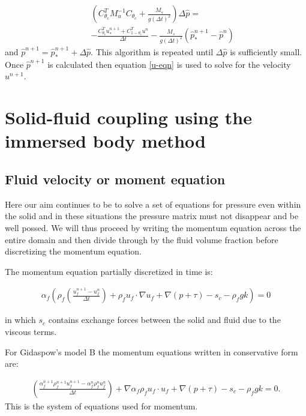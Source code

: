 \begin{eqnarray}
&&\left(C_{\theta_c}^T
M_u^{-1}C_{\theta_c}
+ \frac{M_s}{g (\Delta t)^2}\right) \Delta {\hat p} =  \nonumber\\
&& -\frac{
C_{\theta_c}^T u^{n+1}_*+C_{1-\theta_c}^T u^{n}
}{\Delta t}
-\frac{M_s}{g (\Delta t)^2}({\hat p}_*^{n+1}-{\hat p}^{n})
\label{Ceq5}
\end{eqnarray}
and ${\hat p}^{n+1}={\hat p}_*^{n+1}+\Delta {\hat p}$. This algorithm
is repeated until $\Delta {\hat p}$ is sufficiently small.
Once ${\hat p}^{n+1}$ is calculated then equation \ref{u-eqn}
is used to solve for the velocity $u^{n+1}$.






\vfill\eject



\section{Solid-fluid coupling using the immersed body method}



\subsection{Fluid velocity or moment equation}
Here our aim continues to be to solve a set of equations
for pressure even within the solid and in these situations
the pressure matrix must not disappear and be well possed.
We will thus proceed by writing the momentum equation
across the entire domain and then divide through by the
fluid volume fraction before discretizing the momentum equation.

The momentum equation partially discretized in time is:

\begin{eqnarray}
\alpha_f ( \rho_f (\frac{u_f^{n+1}-u_f^n}{\Delta t})
+ \rho_f u_f\cdot \nabla u_f
+\nabla (p+\tau)  -s_c -\rho_f g k)=0
\label{mom-for-div-by-apha}
\end{eqnarray}

in which $s_c$ contains exchange forces between the
solid and fluid due to the viscous terms.

For Gidaspow's model B the momentum equations written in conservative form are:

\begin{eqnarray}
(\frac{\alpha_f^{n+1} \rho_f^{n+1} u_f^{n+1}-\alpha_f^{n} \rho_f^{n} u_f^n}{\Delta t})
+ \nabla \alpha_f \rho_f u_f\cdot u_f
+\nabla (p+\tau)  -s_c -\rho_f g k=0.
\label{mom-for-div-by-apha-modelB}
\end{eqnarray}
This is the system of equations used for momentum.

